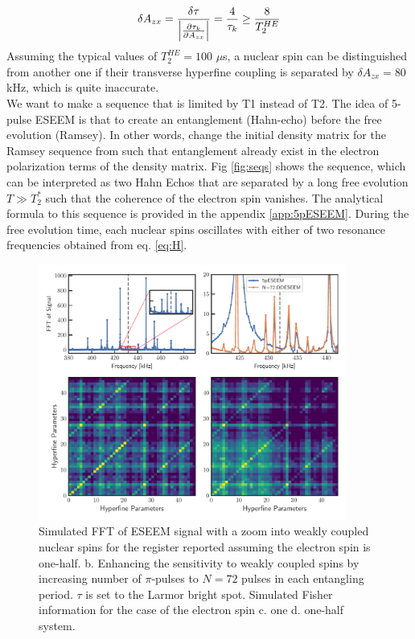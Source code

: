 \documentclass[%
 reprint,
superscriptaddress,
 amsmath,amssymb,
 aps,
]{revtex4-2}
\begin{document}
\begin{gather}
	\delta A_{zx} = \frac{\delta \tau}{\abs{\frac{\partial \tau_k}{\partial A_{zx}}}} = \frac{4}{\tau_k} \ge \frac{8}{T_2^{HE}}
\end{gather}
Assuming the typical values of $T_2^{HE} = 100 $ $\mu$s, a nuclear spin can be distinguished from another one if their transverse hyperfine coupling is separated by $\delta A_{zx} = 80$ kHz, which is quite inaccurate.\\

   
We want to make a sequence that is limited by T1 instead of T2. The idea of 5-pulse ESEEM \cite{kasumaj20085} is that to create an entanglement (Hahn-echo) before the free evolution (Ramsey). In other words, change the initial density matrix for the Ramsey sequence from such that entanglement already exist in the electron polarization terms of the density matrix. Fig \ref{fig:seqs} shows the sequence, which can be interpreted as two Hahn Echos that are separated by a long free evolution $T\gg T_2^\ast$ such that the coherence of the electron spin vanishes. The analytical formula to this sequence is provided in the appendix \ref{app:5pESEEM}. During the free evolution time, each nuclear spins oscillates with either of two resonance frequencies obtained from eq. \ref{eq:H}.

\begin{figure}[htbp]
	\begin{center}
		\includegraphics[width=0.9\textwidth]{pict/eseem_compare2.pdf}
		\caption{Simulated FFT of ESEEM signal with a zoom into weakly coupled nuclear spins for the register reported \cite{abobeih2019atomic} assuming the electron spin is one-half. b. Enhancing the sensitivity to weakly coupled spins by increasing number of $\pi$-pulses to $N=72$ pulses in each entangling period. $\tau$ is set to the Larmor bright spot. Simulated Fisher information for the case of the electron spin c. one d. one-half system.}
		\label{fig:4}
	\end{center}
\end{figure}
\end{document}

